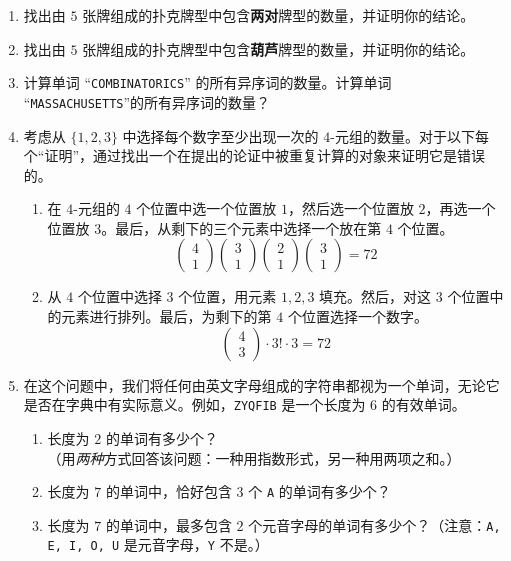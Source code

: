 \begin{enumerate}[label=(\arabic*)]
    \item 找出由 $5$ 张牌组成的扑克牌型中包含\textbf{两对}牌型的数量，并证明你的结论。
    \item 找出由 $5$ 张牌组成的扑克牌型中包含\textbf{葫芦}牌型的数量，并证明你的结论。
    \item 计算单词 ``\verb|COMBINATORICS|'' 的所有异序词的数量。计算单词 ``\verb|MASSACHUSETTS|''的所有异序词的数量？
    \item 考虑从 $\{1, 2, 3\}$ 中选择每个数字至少出现一次的 $4$-元组的数量。对于以下每个``证明''，通过找出一个在提出的论证中被重复计算的对象来证明它是错误的。
          \begin{enumerate}[label=(\alph*)]
              \item 在 $4$-元组的 $4$ 个位置中选一个位置放 $1$，然后选一个位置放 $2$，再选一个位置放 $3$。最后，从剩下的三个元素中选择一个放在第 $4$ 个位置。
                    \[\begin{pmatrix}4\\1\end{pmatrix}\begin{pmatrix}3\\1\end{pmatrix}\begin{pmatrix}2\\1\end{pmatrix}\begin{pmatrix}3\\1\end{pmatrix} = 72\]
              \item 从 $4$ 个位置中选择 $3$ 个位置，用元素 $1,2,3$ 填充。然后，对这 $3$ 个位置中的元素进行排列。最后，为剩下的第 $4$ 个位置选择一个数字。
                    \[\begin{pmatrix}4\\3\end{pmatrix} \cdot 3! \cdot 3 = 72\]
          \end{enumerate}
    \item 在这个问题中，我们将任何由英文字母组成的字符串都视为一个单词，无论它是否在字典中有实际意义。例如，\verb|ZYQFIB| 是一个长度为 $6$ 的有效单词。
          \begin{enumerate}[label=(\alph*)]
              \item 长度为 $2$ 的单词有多少个？\\
                    （用\emph{两种}方式回答该问题：一种用指数形式，另一种用两项之和。）
              \item 长度为 $7$ 的单词中，恰好包含 $3$ 个 \verb|A| 的单词有多少个？
              \item 长度为 $7$ 的单词中，最多包含 $2$ 个元音字母的单词有多少个？（注意：\verb|A, E, I, O, U| 是元音字母，\verb|Y| 不是。）
          \end{enumerate}


\end{enumerate}
